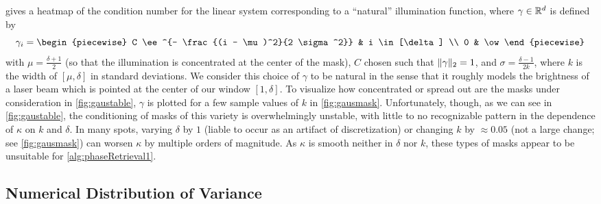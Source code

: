  gives a heatmap of the condition number for the linear system corresponding to a ``natural'' illumination function, where $\gamma \in \mathbb{R}^d$ is defined by \[\gamma_i = \begin{piecewise} C \ee^{- \frac{(i - \mu)^2}{2 \sigma^2}} & i \in [\delta] \\ 0 & \ow \end{piecewise}\] with $\mu = \frac{\delta + 1}{2}$ (so that the illumination is concentrated at the center of the mask), $C$ chosen such that $\lVert\gamma\rVert_2 = 1$, and $\sigma = \frac{\delta - 1}{2 k}$, where $k$ is the width of $[\mu, \delta]$ in standard deviations.  We consider this choice of $\gamma$ to be natural in the sense that it roughly models the brightness of a laser beam which is pointed at the center of our window $[1, \delta]$.  To visualize how concentrated or spread out are the masks under consideration in \cref{fig:gaustable}, $\gamma$ is plotted for a few sample values of $k$ in \cref{fig:gausmask}.  Unfortunately, though, as we can see in \cref{fig:gaustable}, the conditioning of masks of this variety is overwhelmingly unstable, with little to no recognizable pattern in the dependence of $\kappa$ on $k$ and $\delta$.  In many spots, varying $\delta$ by $1$ (liable to occur as an artifact of discretization) or changing $k$ by $\approx 0.05$ (not a large change; see \cref{fig:gausmask}) can worsen $\kappa$ by multiple orders of magnitude.  As $\kappa$ is smooth neither in $\delta$ nor $k$, these types of masks appear to be unsuitable for \cref{alg:phaseRetrieval1}.

\subsection{Numerical Distribution of Variance}
\label{sec:distvar_num}

